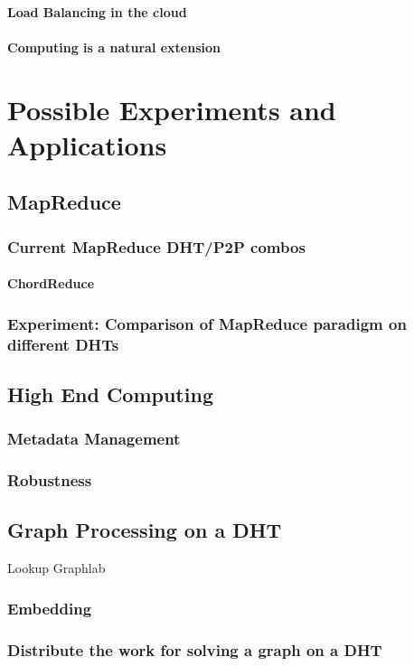 \documentclass[10pt,letterpaper]{report}
\begin{document}
\subsubsection{Load Balancing in the cloud}
\subsubsection{Computing is a natural extension}

\chapter{Possible Experiments and Applications}


\section{MapReduce}
\subsection{Current MapReduce DHT/P2P combos}
\subsubsection{ChordReduce}
\subsection{Experiment: Comparison of MapReduce paradigm on different DHTs}


\section{High End Computing}
\subsection{Metadata Management}
\subsection{Robustness}

\section{Graph Processing on a DHT}
Lookup Graphlab
\subsection{Embedding}
\subsection{Distribute the work for solving a graph on a DHT}
\end{document}
